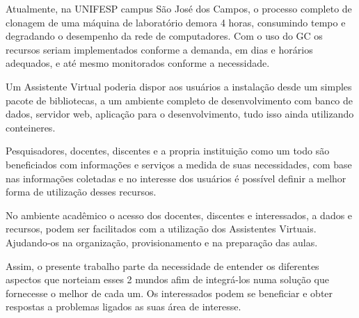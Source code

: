 \documentclass[quali]{mpit}
\begin{document}
Atualmente, na UNIFESP campus São José dos Campos, o processo completo de clonagem de uma máquina de laboratório demora 4 horas, consumindo tempo e degradando o desempenho da rede de computadores. Com o uso do GC os recursos seriam implementados conforme a demanda, em dias e horários adequados, e até mesmo monitorados conforme a necessidade. 

Um Assistente Virtual poderia dispor aos usuários a instalação desde um simples pacote de bibliotecas, a um ambiente completo de desenvolvimento com banco de dados, servidor web, aplicação para o desenvolvimento, tudo isso ainda utilizando conteineres.

Pesquisadores, docentes, discentes e a propria instituição como um todo são beneficiados com informações e serviços a medida de suas necessidades, com base nas informações coletadas e no interesse dos usuários é possível definir a melhor forma de utilização desses recursos. 

No ambiente acadêmico o acesso dos docentes, discentes e interessados, a dados e recursos, podem ser facilitados com a utilização dos Assistentes Virtuais. Ajudando-os na organização, provisionamento e na preparação das aulas.

Assim, o presente trabalho parte da necessidade de entender os diferentes aspectos que norteiam esses 2 mundos afim de integrá-los numa solução que fornecesse o melhor de cada um. Os interessados podem se beneficiar e obter respostas a problemas ligados as suas área de interesse.
\end{document}
